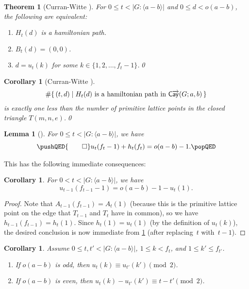 \documentclass[11pt]{amsart}
\newtheorem{thm}[equation]{Theorem}
\newtheorem{lem}[equation]{Lemma}
\newtheorem{cor}[equation]{Corollary}
\theoremstyle{definition}
\numberwithin{case}{startcases}
\numberwithin{equation}{section}
\newcommand{\cayd}{\mathop{\mathsf{C}\mkern-1mu\overrightarrow{\mathsf{ay}}}}
\begin{document}
	\begin{thm}[Curran-Witte {\cite[Thm.~7.1]{Curran}}] \label{HPiff}
		For $0 \le t < |G : \langle a-b \rangle|$ and $0 \le d < o(a - b)$, the following are equivalent:
		\begin{enumerate}
			\item \label{HPiff-Htd}
			$H_t(d)$ is a hamiltonian path.
			\item \label{HPiff-Btd}
			$B_t(d) = (0,0)$.
			\item \label{HPiff-utk}
			$d = u_t(k)$ for some $k \in \{1,2,\ldots, f_t - 1\}$.\qed
		\end{enumerate}
	\end{thm}
	
	\begin{cor}[Curran-Witte {\cite[Rem.~8.4]{Curran}}] \label{NumHP}
		\[ \# \{ \, (t,d) \mid \text{$H_t(d)$ is a hamiltonian path in $\cayd(G; a,b)$} \,\} \]
		is exactly one less than the number of primitive lattice points in the closed triangle $T(m,n,e)$.\qed
	\end{cor}
	
	\begin{lem}[{\cite[Prop.~3.13]{Curran}}]\label{vertices}
		For $0 \le t < |G \colon \langle a - b \rangle|$, we have
		\[ 
		\pushQED{\qed} 
		u_t(f_t - 1) + h_t(f_t) = o(a - b) - 1. 
		\qedhere
		\popQED
		\]
	\end{lem}
	
	This has the following immediate consequences:
	
	\begin{cor} \label{ut+ut}
		For $0 < t < |G \colon \langle a - b \rangle|$, we have
		\[ u_{t-1}(f_{t-1} - 1) = o(a - b) - 1 - u_t(1) . \]
	\end{cor}
	
	\begin{proof}
		Note that $A_{t-1}(f_{t-1}) = A_t(1)$ (because this is the primitive lattice point on the edge that $T_{t-1}$ and $T_t$ have in common), so we have $h_{t-1}(f_{t-1}) = h_t(1)$. Since $h_t(1) = u_t(1)$ (by the definition of $u_t(k)$), the desired conclusion is now immediate from \cref{vertices} (after replacing~$t$ with~$t-1$).
	\end{proof}
	
	\begin{cor} \label{parity}
		Assume $0 \le t, t' < |G : \langle a - b \rangle|$, $1 \le k < f_t$, and $1 \le k' \le f_{t'}$.
		\begin{enumerate}
			\item \label{parity-odd}
			If $o(a - b)$ is odd, then $u_t(k) \equiv u_{t'}(k') \pmod{2}$.
			\item \label{parity-even}
			If $o(a - b)$ is even, then $u_t(k) - u_{t'}(k') \equiv t - t' \pmod{2}$.
		\end{enumerate}
	\end{cor}
	
\end{document}
